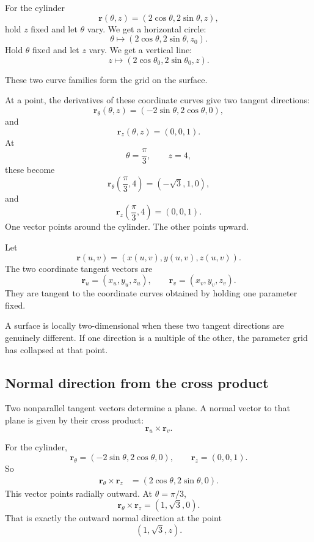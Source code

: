 For the cylinder
\[
    \mathbf r(\theta,z)=(2\cos\theta,2\sin\theta,z),
\]
hold \(z\) fixed and let \(\theta\) vary.  We get a horizontal circle:
\[
    \theta\longmapsto (2\cos\theta,2\sin\theta,z_0).
\]
Hold \(\theta\) fixed and let \(z\) vary.  We get a vertical line:
\[
    z\longmapsto (2\cos\theta_0,2\sin\theta_0,z).
\]

These two curve families form the grid on the surface.

At a point, the derivatives of these coordinate curves give two tangent directions:
\[
    \mathbf r_\theta(\theta,z)=(-2\sin\theta,2\cos\theta,0),
\]
and
\[
    \mathbf r_z(\theta,z)=(0,0,1).
\]
At
\[
    \theta=\frac{\pi}{3},\qquad z=4,
\]
these become
\[
    \mathbf r_\theta\left(\frac{\pi}{3},4\right)=(-\sqrt3,1,0),
\]
and
\[
    \mathbf r_z\left(\frac{\pi}{3},4\right)=(0,0,1).
\]
One vector points around the cylinder.  The other points upward.

\begin{definition}
Let
\[
    \mathbf r(u,v)=(x(u,v),y(u,v),z(u,v)).
\]
The two coordinate tangent vectors are
\[
\boxed{
    \mathbf r_u=(x_u,y_u,z_u),
    \qquad
    \mathbf r_v=(x_v,y_v,z_v).
}
\]
They are tangent to the coordinate curves obtained by holding one parameter fixed.
\end{definition}

A surface is locally two-dimensional when these two tangent directions are genuinely
different.  If one direction is a multiple of the other, the parameter grid has collapsed
at that point.

\subsection{Normal direction from the cross product}

Two nonparallel tangent vectors determine a plane.  A normal vector to that plane is
given by their cross product:
\[
    \mathbf r_u\times \mathbf r_v.
\]

For the cylinder,
\[
    \mathbf r_\theta=(-2\sin\theta,2\cos\theta,0),
    \qquad
    \mathbf r_z=(0,0,1).
\]
So
\[
\begin{aligned}
    \mathbf r_\theta\times \mathbf r_z
    &=
    (2\cos\theta,2\sin\theta,0).
\end{aligned}
\]
This vector points radially outward.  At \(\theta=\pi/3\),
\[
    \mathbf r_\theta\times \mathbf r_z=(1,\sqrt3,0).
\]
That is exactly the outward normal direction at the point
\[
    (1,\sqrt3,z).
\]

